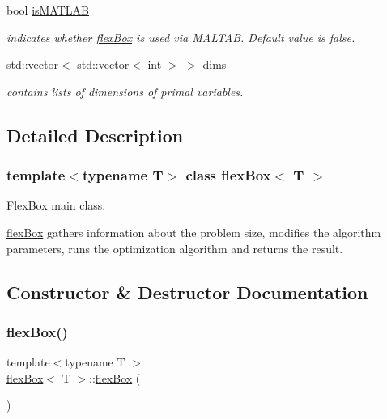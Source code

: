 \begin{DoxyCompactItemize}
\mbox{\label{classflex_box_a8d280f8e287a339fc93ae7683b70456d}} 
bool \hyperlink{classflex_box_a8d280f8e287a339fc93ae7683b70456d}{is\+M\+A\+T\+L\+AB}
\begin{DoxyCompactList}\small\item\em indicates whether \hyperlink{classflex_box}{flex\+Box} is used via M\+A\+L\+T\+AB. Default value is false. \end{DoxyCompactList}\item 
\mbox{\label{classflex_box_aa22360c61e78b237e51596fa533618e1}} 
std\+::vector$<$ std\+::vector$<$ int $>$ $>$ \hyperlink{classflex_box_aa22360c61e78b237e51596fa533618e1}{dims}
\begin{DoxyCompactList}\small\item\em contains lists of dimensions of primal variables. \end{DoxyCompactList}\end{DoxyCompactItemize}


\subsection{Detailed Description}
\subsubsection*{template$<$typename T$>$\newline
class flex\+Box$<$ T $>$}

Flex\+Box main class. 

\hyperlink{classflex_box}{flex\+Box} gathers information about the problem size, modifies the algorithm parameters, runs the optimization algorithm and returns the result. 

\subsection{Constructor \& Destructor Documentation}
\mbox{\label{classflex_box_aa325ce1968dc664c0e8e37bdefc25247}} 
\subsubsection{\texorpdfstring{flex\+Box()}{flexBox()}}
{\footnotesize\ttfamily template$<$typename T $>$ \\
\hyperlink{classflex_box}{flex\+Box}$<$ T $>$\+::\hyperlink{classflex_box}{flex\+Box} (\begin{DoxyParamCaption}{ }\end{DoxyParamCaption})\hspace{0.3cm}{\ttfamily [inline]}}



